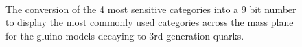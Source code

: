 \clearpage
\begin{figure}
  \caption{The conversion of the 4 most sensitive categories into a 9 bit number to display the
  most commonly used categories across the mass plane for the gluino models decaying to 3rd generation quarks.
  \label{fig:jetRanking_gluino}}
  \begin{center}    
     ~~
     \\
  \end{center}
\end{figure}

